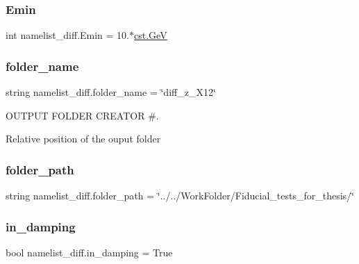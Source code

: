 \subsubsection{\texorpdfstring{Emin}{Emin}}
{\footnotesize\ttfamily int namelist\+\_\+diff.\+Emin = 10.$\ast$\hyperlink{constants_8h_aec0e126d9991db8ad0b26139f5860568}{cst.\+GeV}}

\mbox{\label{namespacenamelist__diff_ab0429c76e7ec948becd63466be73bff5}} 
\subsubsection{\texorpdfstring{folder\+\_\+name}{folder\_name}}
{\footnotesize\ttfamily string namelist\+\_\+diff.\+folder\+\_\+name = \char`\"{}diff\+\_\+z\+\_\+\+X12\char`\"{}}



O\+U\+T\+P\+UT F\+O\+L\+D\+ER C\+R\+E\+A\+T\+OR \#. 

Relative position of the ouput folder \mbox{\label{namespacenamelist__diff_aaa5e2a88407b65c86c9af2720dc4c0d1}} 
\subsubsection{\texorpdfstring{folder\+\_\+path}{folder\_path}}
{\footnotesize\ttfamily string namelist\+\_\+diff.\+folder\+\_\+path = \char`\"{}../../Work\+Folder/Fiducial\+\_\+tests\+\_\+for\+\_\+thesis/\char`\"{}}

\mbox{\label{namespacenamelist__diff_a420589c9c36e26b6b36ef4e710967e97}} 
\subsubsection{\texorpdfstring{in\+\_\+damping}{in\_damping}}
{\footnotesize\ttfamily bool namelist\+\_\+diff.\+in\+\_\+damping = True}



